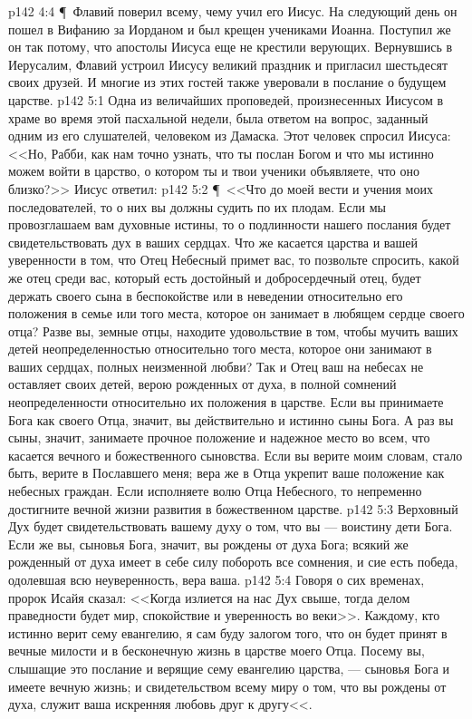 \vs p142 4:4 \P\ Флавий поверил всему, чему учил его Иисус. На следующий день он пошел в Вифанию за Иорданом и был крещен учениками Иоанна. Поступил же он так потому, что апостолы Иисуса еще не крестили верующих. Вернувшись в Иерусалим, Флавий устроил Иисусу великий праздник и пригласил шестьдесят своих друзей. И многие из этих гостей также уверовали в послание о будущем царстве.
\vs p142 5:1 Одна из величайших проповедей, произнесенных Иисусом в храме во время этой пасхальной недели, была ответом на вопрос, заданный одним из его слушателей, человеком из Дамаска. Этот человек спросил Иисуса: <<Но, Рабби, как нам точно узнать, что ты послан Богом и что мы истинно можем войти в царство, о котором ты и твои ученики объявляете, что оно близко?>> Иисус ответил:
\vs p142 5:2 \P\ <<Что до моей вести и учения моих последователей, то о них вы должны судить по их плодам. Если мы провозглашаем вам духовные истины, то о подлинности нашего послания будет свидетельствовать дух в ваших сердцах. Что же касается царства и вашей уверенности в том, что Отец Небесный примет вас, то позвольте спросить, какой же отец среди вас, который есть достойный и добросердечный отец, будет держать своего сына в беспокойстве или в неведении относительно его положения в семье или того места, которое он занимает в любящем сердце своего отца? Разве вы, земные отцы, находите удовольствие в том, чтобы мучить ваших детей неопределенностью относительно того места, которое они занимают в ваших сердцах, полных неизменной любви? Так и Отец ваш на небесах не оставляет своих детей, верою рожденных от духа, в полной сомнений неопределенности относительно их положения в царстве. Если вы принимаете Бога как своего Отца, значит, вы действительно и истинно сыны Бога. А раз вы сыны, значит, занимаете прочное положение и надежное место во всем, что касается вечного и божественного сыновства. Если вы верите моим словам, стало быть, верите в Пославшего меня; вера же в Отца укрепит ваше положение как небесных граждан. Если исполняете волю Отца Небесного, то непременно достигните вечной жизни развития в божественном царстве.
\vs p142 5:3 Верховный Дух будет свидетельствовать вашему духу о том, что вы --- воистину дети Бога. Если же вы, сыновья Бога, значит, вы рождены от духа Бога; всякий же рожденный от духа имеет в себе силу побороть все сомнения, и сие есть победа, одолевшая всю неуверенность, вера ваша.
\vs p142 5:4 Говоря о сих временах, пророк Исайя сказал: <<Когда излиется на нас Дух свыше, тогда делом праведности будет мир, спокойствие и уверенность во веки>>. Каждому, кто истинно верит сему евангелию, я сам буду залогом того, что он будет принят в вечные милости и в бесконечную жизнь в царстве моего Отца. Посему вы, слышащие это послание и верящие сему евангелию царства, --- сыновья Бога и имеете вечную жизнь; и свидетельством всему миру о том, что вы рождены от духа, служит ваша искренняя любовь друг к другу<<.
